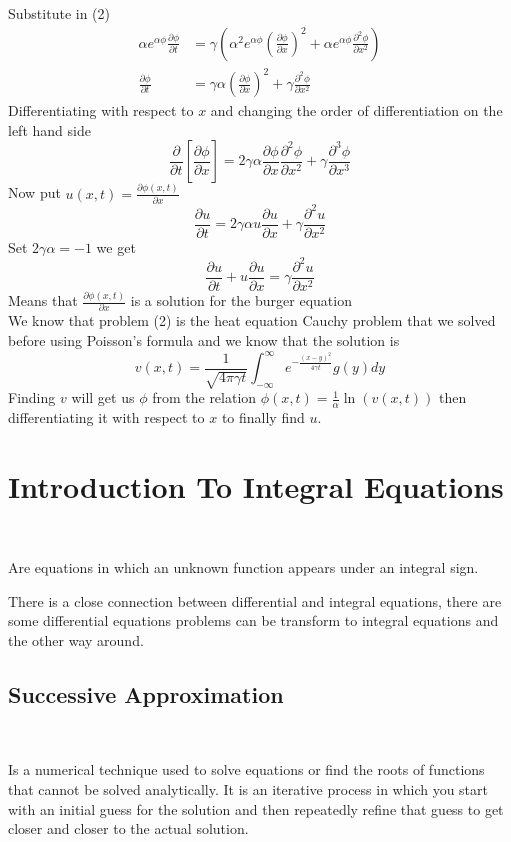 \documentclass[]{article}
\begin{document}
Substitute in (2)
\begin{align}
\alpha e^{\alpha\phi} \frac{\partial \phi}{\partial t} &= \gamma\left(\alpha^2 e^{\alpha \phi} {\left(\frac{\partial \phi}{\partial x}\right)}^2 + \alpha e^{\alpha\phi} \frac{\partial^2 \phi}{\partial x^2}\right)\nonumber
\\
\frac{\partial \phi}{\partial t} &= \gamma\alpha {\left(\frac{\partial \phi}{\partial x}\right)}^2 + \gamma \frac{\partial^2 \phi}{\partial x^2}
\end{align}
Differentiating with respect to $x$ and changing the order of differentiation on the left hand side
\[
    \frac{\partial }{\partial t}\left[ \frac{\partial \phi}{\partial x}\right] = 2\gamma\alpha \frac{\partial\phi}{\partial x}\frac{\partial^2 \phi }{\partial x^2} + \gamma\frac{\partial^3 \phi}{\partial x^3}    
\]
Now put $\displaystyle u(x,t) = \frac{\partial \phi(x,t)}{\partial x}$
\[
    \frac{\partial u }{\partial t} = 2\gamma\alpha u\frac{\partial u}{\partial x} + \gamma\frac{\partial^2 u}{\partial x^2}    
\]
Set $2\gamma\alpha = -1$ we get
\[
    \frac{\partial u }{\partial t} + u\frac{\partial u}{\partial x} = \gamma\frac{\partial^2 u}{\partial x^2}    
\]
Means that $\displaystyle \frac{\partial \phi(x,t)}{\partial x}$ is a solution for the burger equation 
\\
We know that problem (2) is the heat equation Cauchy problem that we solved before using Poisson's formula and we know that the solution is 
\[
v(x,t) = \frac{1}{\sqrt{4\pi \gamma t}} \int_{-\infty}^{\infty} e^{\textstyle -\frac{(x-y)^2}{4\gamma t}} g(y)dy    
\]
Finding $v$ will get us $\phi$ from the relation $\displaystyle \phi(x,t) = \frac{1}{\alpha}\ln(v(x,t))$ then differentiating it with respect to $x$ to finally find $u$.

\section{Introduction To Integral Equations}
\
\begin{definition}
    Are equations in which an unknown function appears under an integral sign.
\end{definition}
There is a close connection between differential and integral equations, 
there are some differential equations problems can be transform to integral equations and the other way around.

\subsection{Successive Approximation}
\
\begin{definition}
    Is a numerical technique used to solve equations or find the roots of functions that cannot be solved analytically. It is an iterative process in which you start with an initial guess for the solution and then repeatedly refine that guess to get closer and closer to the actual solution.
\end{definition}
\end{document}
